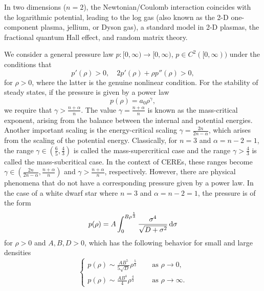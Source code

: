 \documentclass[reqno,11pt]{amsart}
\numberwithin{equation}{section}
\theoremstyle{definition}
\def\dd{{\, \rm d}}
\begin{document}
\smallskip
In two dimensions ($n=2$), the Newtonian/Coulomb interaction coincides with the logarithmic potential, leading to the log gas (also known as the 2-D one-component plasma, jellium, or Dyson gas), a standard model in 2-D plasmas, the fractional quantum Hall effect, and random matrix theory.

\smallskip
We consider a general pressure law $p: [0,\infty) \to [0,\infty)$, $p \in C^2([0,\infty))$ under the conditions that
\begin{equation}\label{Press}
    p'(\rho) > 0, \quad 2p'(\rho) + \rho p''(\rho) > 0,
\end{equation}
for $\rho > 0$, where the latter is the genuine nonlinear condition. 
For the stability of steady states, if the pressure is given by a power law
\[
p(\rho) = a_0 \rho^\gamma,
\]
we require that $\gamma > \frac{n + \alpha}{n}$. 
The value $\gamma = \frac{n+\alpha}{n}$ is known as the mass-critical exponent, 
arising from the balance between the internal and potential energies.
Another important scaling is the energy-critical scaling  $\gamma = \frac{2n}{2n - \alpha}$,
which arises from the scaling of the potential energy.
Classically, for $n=3$ and $\alpha = n-2 = 1$, the range $\gamma\in(\frac{6}{5},\frac{4}{3})$ 
is called the mass-supercritical case and the range $\gamma > \frac{4}{3}$ is called the mass-subcritical case. 
In the context of CEREs, these ranges become $\gamma\in(\frac{2n}{2n - \alpha}, \frac{n + \alpha}{n})$ 
and $\gamma > \frac{n + \alpha}{n}$, respectively. 
However, there are physical phenomena that do not have a corresponding pressure given by a power law. 
In the case of a white dwarf star where $n=3$ and $\alpha = n-2 = 1$, the pressure is of the form
\begin{equation}\label{white}
    p(\rho) = A \int^{B\rho^\frac{1}{3}}_0 \frac{\sigma^4}{\sqrt{D + \sigma^2}} \dd \sigma
\end{equation}
for $\rho > 0$ and $A,B,D > 0$, which has the following behavior for small and large densities
\begin{equation}\label{asymp}
    \begin{cases}
        p(\rho) \sim \frac{A B^5 }{5\sqrt{D}}\rho^\frac{5}{3} \quad& \text{ as } \rho \to 0, \\[2mm]
        p(\rho) \sim \frac{A B^4 }{4}\rho^\frac{4}{3} \quad& \text{ as } \rho \to \infty.
    \end{cases}
\end{equation}

\smallskip
\end{document}
